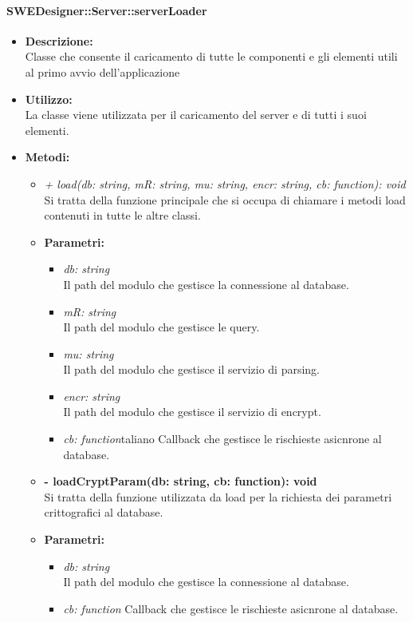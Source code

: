       \paragraph{SWEDesigner::Server::serverLoader}
        \begin{itemize}
          \item \textbf{Descrizione:}\\
          Classe che consente il caricamento di tutte le componenti e gli elementi utili al primo avvio dell'applicazione
          \item \textbf{Utilizzo:}\\
          La classe viene utilizzata per il caricamento del server e di tutti i suoi elementi.
          \item \textbf{Metodi:}\\
          \begin{itemize}
            \item \emph{+ load(db: string, mR: string, mu: string, encr: string, cb: function): void}\\
            Si tratta della funzione principale che si occupa di chiamare i metodi load contenuti in tutte le altre classi.
            \item \textbf{Parametri:}\\
            \begin{itemize}
              \item \emph{db: string}\\
              Il path del modulo che gestisce la connessione al database.
              \item \emph{mR: string}\\
              Il path del modulo che gestisce le query.
              \item \emph{mu: string}\\
              Il path del modulo che gestisce il servizio di parsing.
              \item \emph{encr: string}\\
              Il path del modulo che gestisce il servizio di encrypt.
              \item \emph{cb: function}taliano
              Callback che gestisce le rischieste asicnrone al database.
            \end{itemize}
            \item \textbf{- loadCryptParam(db: string, cb: function): void}\\
            Si tratta della funzione utilizzata da load per la richiesta dei parametri crittografici al database.
            \item \textbf{Parametri:}\\
            \begin{itemize}
              \item \emph{db: string}\\
              Il path del modulo che gestisce la connessione al database.
              \item \emph{cb: function}
              Callback che gestisce le rischieste asicnrone al database.
            \end{itemize}
          \end{itemize}
        \end{itemize}
